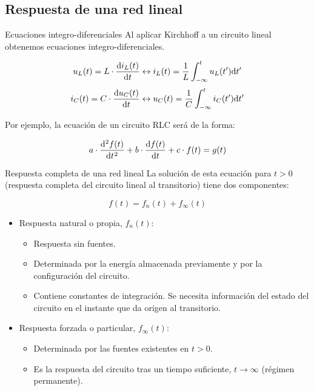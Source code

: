 \documentclass[aspectratio=169, usenames,svgnames,dvipsnames]{beamer}
\begin{document}
\subsection{Respuesta de una red lineal}
\label{sec:org18fca1c}

\begin{frame}[label={sec:org5b6aa91}]{Ecuaciones integro-diferenciales}
Al aplicar Kirchhoff a un circuito lineal obtenemos ecuaciones integro-diferenciales. 

\[
  u_L(t) = L \cdot \diff{i_L(t)}{t}
  \leftrightarrow
  i_L(t) = \frac{1}{L} \int^t_{-\infty}u_L(t') \mathrm{d}t'
\]
\[
  i_C(t) = C \cdot \diff{u_C(t)}{t}
  \leftrightarrow
  u_C(t) = \frac{1}{C} \int^t_{-\infty}i_C(t') \mathrm{d}t'
\]

Por ejemplo, la ecuación de un circuito RLC será de la forma:

\[
  a \cdot \diff[2]{f(t)}{t} + b \cdot \diff{f(t)}{t} + c \cdot f(t) = g(t)
\]
\end{frame}

\begin{frame}[label={sec:org77d4c45}]{Respuesta completa de una red lineal}
La solución de esta ecuación para \(t > 0\) (respuesta completa del circuito lineal al transitorio) tiene dos componentes:

\[
 \boxed{f(t) = f_n(t) + f_\infty(t) }
 \]

\begin{itemize}
\item Respuesta \alert{natural} o propia, \(f_n(t)\):
\begin{itemize}
\item Respuesta sin fuentes.
\item Determinada por la energía almacenada previamente y por la configuración del circuito.
\item Contiene constantes de integración. Se necesita información del estado del circuito en el instante que da origen al transitorio.
\end{itemize}
\item Respuesta \alert{forzada} o particular, \(f_\infty(t)\):
\begin{itemize}
\item Determinada por las fuentes existentes en \(t > 0\).
\item Es la respuesta del circuito tras un tiempo suficiente, \(t \to \infty\) (régimen permanente).
\end{itemize}
\end{itemize}
\end{frame}
\end{document}
